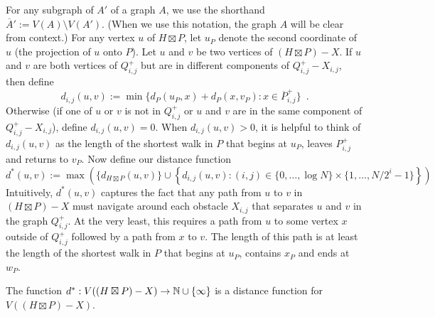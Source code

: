 \documentclass{patmorin}
\makeatletter
\def\mathcolor#1#{\@mathcolor{#1}}
\def\@mathcolor#1#2#3{%
  \protect\leavevmode
  \begingroup
    \color#1{#2}#3%
  \endgroup
}
\newcommand{\mathdefin}[1]{\mathcolor{brightmaroon}{#1}}
\makeatother
\begin{document}
For any subgraph of $A'$ of a graph $A$, we use the shorthand $\overline{A}':=V(A)\setminus V(A')$. (When we use this notation, the graph $A$ will be clear from context.)
For any vertex $u$ of $H\boxtimes P$, let $u_P$ denote the second coordinate of $u$ (the projection of $u$ onto $P$).  Let $u$ and $v$ be two vertices of $(H\boxtimes P)-X$.  If $u$ and $v$ are both vertices of $Q^+_{i,j}$ but are in different components of $Q^+_{i,j}-X_{i,j}$, then define
\[
  d_{i,j}(u,v):=\min \{d_P(u_P,x) + d_P(x,v_P):x\in \overline{P}^+_{i,j}\} \enspace .
\]
Otherwise (if one of $u$ or $v$ is not in $Q^+_{i,j}$ or $u$ and $v$ are in the same component of $Q^+_{i,j}-X_{i,j}$), define $d_{i,j}(u,v)=0$.  When $d_{i,j}(u,v)>0$, it is helpful to think of $d_{i,j}(u,v)$ as the length of the shortest walk in $P$ that begins at $u_P$, leaves $P^+_{i,j}$ and returns to $v_P$.  Now define our distance function
\[
  d^*(u,v):=\max\left(\{d_{H\boxtimes P}(u,v)\}\cup \left\{d_{i,j}(u,v):(i,j)\in\{0,\ldots,\log N\}\times\{1,\ldots,N/2^i-1\}\right\}\right)
\]
Intuitively, $d^*(u,v)$ captures the fact that any path from $u$ to $v$ in $(H\boxtimes P)-X$ must navigate around each obstacle $X_{i,j}$ that separates $u$ and $v$ in the graph $Q^+_{i,j}$.  At the very least, this requires a path from $u$ to some vertex $x$ outside of $Q^+_{i,j}$ followed by a path from $x$ to $v$.  The length of this path is at least the length of the shortest walk in $P$ that begins at $u_P$, contains $x_P$ and ends at $w_P$.

\begin{lem}\label{d_star_distance}
  The function $d^*:V((H\boxtimes P)-X)\to\mathbb{N}\cup\{\infty\}$ is a distance function for $V((H\boxtimes P)-X)$.
\end{lem}
\end{document}
